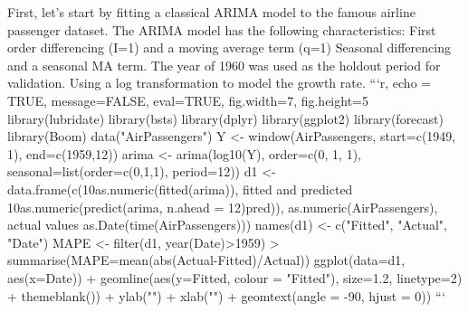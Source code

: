 {}\markdownRendererInterblockSeparator
{}\markdownRendererInterblockSeparator
{}First, let's start by fitting a classical ARIMA model to the famous airline passenger dataset. The ARIMA model has the following characteristics:\markdownRendererInterblockSeparator
{}\markdownRendererUlBeginTight
\markdownRendererUlItem First order differencing (\markdownRendererDollarSign{}I=1\markdownRendererDollarSign{}) and a moving average term (\markdownRendererDollarSign{}q=1\markdownRendererDollarSign{})\markdownRendererUlItemEnd 
\markdownRendererUlItem Seasonal differencing and a seasonal MA term.\markdownRendererUlItemEnd 
\markdownRendererUlItem The year of 1960 was used as the holdout period for validation.\markdownRendererUlItemEnd 
\markdownRendererUlItem Using a log transformation to model the growth rate.\markdownRendererUlItemEnd 
\markdownRendererUlEndTight \markdownRendererInterblockSeparator
{}```\markdownRendererLeftBrace{}r, echo = TRUE, message=FALSE, eval=TRUE, fig.width=7, fig.height=5\markdownRendererRightBrace{} library(lubridate) library(bsts) library(dplyr) library(ggplot2) library(forecast) library(Boom)\markdownRendererInterblockSeparator
{}data("AirPassengers") Y <- window(AirPassengers, start=c(1949, 1), end=c(1959,12)) arima <- arima(log10(Y), order=c(0, 1, 1), seasonal=list(order=c(0,1,1), period=12))\markdownRendererInterblockSeparator
{}d1 <- data.frame(c(10\markdownRendererCircumflex{}as.numeric(fitted(arima)), \markdownRendererHash{} fitted and predicted 10\markdownRendererCircumflex{}as.numeric(predict(arima, n.ahead = 12)\markdownRendererDollarSign{}pred)), as.numeric(AirPassengers), \markdownRendererHash{}actual values as.Date(time(AirPassengers))) names(d1) <- c("Fitted", "Actual", "Date")\markdownRendererInterblockSeparator
{}MAPE <- filter(d1, year(Date)>1959) \markdownRendererPercentSign{}>\markdownRendererPercentSign{} summarise(MAPE=mean(abs(Actual-Fitted)/Actual))\markdownRendererInterblockSeparator
{}ggplot(data=d1, aes(x=Date)) + geomline(aes(y=Fitted, colour = "Fitted"), size=1.2, linetype=2) + themeblank()) + ylab("") + xlab("") + geomtext(angle = -90, hjust = 0)) ```\markdownRendererInterblockSeparator
